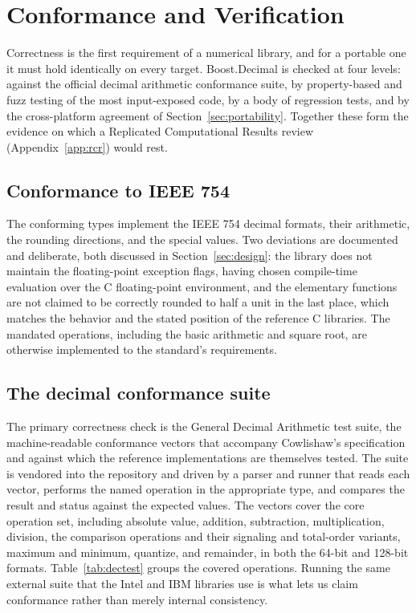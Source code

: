 \documentclass[acmsmall]{acmart}
\begin{document}
\section{Conformance and Verification}
\label{sec:verification}

Correctness is the first requirement of a numerical library, and for a portable one it
must hold identically on every target. Boost.Decimal is checked at four levels: against
the official decimal arithmetic conformance suite, by property-based and fuzz testing of
the most input-exposed code, by a body of regression tests, and by the cross-platform
agreement of Section~\ref{sec:portability}. Together these form the evidence on which a
Replicated Computational Results review (Appendix~\ref{app:rcr}) would rest.

\subsection{Conformance to IEEE 754}
The conforming types implement the IEEE 754 decimal formats, their arithmetic, the
rounding directions, and the special values. Two deviations are documented and
deliberate, both discussed in Section~\ref{sec:design}: the library does not maintain the
floating-point exception flags, having chosen compile-time evaluation over the C
floating-point environment, and the elementary functions are not claimed to be correctly
rounded to half a unit in the last place, which matches the behavior and the stated
position of the reference C libraries. The mandated operations, including the basic
arithmetic and square root, are otherwise implemented to the standard's requirements.

\subsection{The decimal conformance suite}
The primary correctness check is the General Decimal Arithmetic test suite, the
machine-readable conformance vectors that accompany Cowlishaw's specification
\cite{Cowlishaw2003} and against which the reference implementations are themselves
tested. The suite is vendored into the repository and driven by a parser and runner that
reads each vector, performs the named operation in the appropriate type, and compares the
result and status against the expected values. The vectors cover the core operation set,
including absolute value, addition, subtraction, multiplication, division, the comparison
operations and their signaling and total-order variants, maximum and minimum, quantize,
and remainder, in both the 64-bit and 128-bit formats. Table~\ref{tab:dectest} groups the
covered operations. Running the same external suite that the Intel and IBM libraries use is
what lets us claim conformance rather than merely internal consistency.
\end{document}
